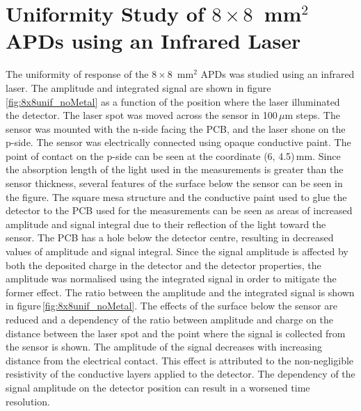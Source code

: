 \documentclass[review,number,sort&compress]{elsarticle}
\begin{document}
\section{Uniformity Study of $8 \times 8$~mm$^2$ APDs using an Infrared Laser}
\label{sec:unif8x8laser}

The uniformity of response of the $8 \times 8$~mm$^2$ APDs was studied using an infrared laser.
The amplitude and integrated signal are shown in figure\,\ref{fig:8x8unif_noMetal} as a function of the position where the laser illuminated the detector.
The laser spot was moved across the sensor in 100\,$\mu$m steps.
The sensor was mounted with the n-side facing the PCB, and the laser shone on the p-side.
The sensor was electrically connected using opaque conductive paint.
The point of contact on the p-side can be seen at the coordinate (6, 4.5)\,mm.
Since the absorption length of the light used in the measurements is greater than the sensor thickness, several features of the surface below the sensor can be seen in the figure.
The square mesa structure and the conductive paint used to glue the detector to the PCB used for the measurements can be seen as areas of increased amplitude and signal integral due to their reflection of the light toward the sensor.
The PCB has a hole below the detector centre, resulting in decreased values of amplitude and signal integral.
Since the signal amplitude is affected by both the deposited charge in the detector and the detector properties, the amplitude was normalised using the integrated signal in order to mitigate the former effect.
The ratio between the amplitude and the integrated signal is shown in figure\,\ref{fig:8x8unif_noMetal}.
The effects of the surface below the sensor are reduced and a dependency of the ratio between amplitude and charge on the distance between the laser spot and the point where the signal is collected from the sensor is shown.
The amplitude of the signal decreases with increasing distance from the electrical contact.
This effect is attributed to the non-negligible resistivity of the conductive layers applied to the detector.
The dependency of the signal amplitude on the detector position can result in a worsened time resolution.
\end{document}
